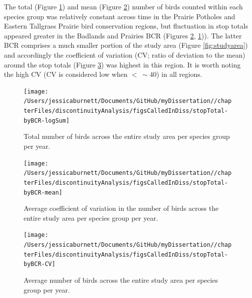 \documentclass[12pt,twoside,openany]{reedthesis}
\begin{document}
The total (Figure \ref{fig:stopTotalSum}) and mean (Figure \ref{fig:stopTotalMean}) number of birds counted within each species group was relatively constant across time in the Prairie Potholes and Eastern Tallgrass Prairie bird conservation regions, but fluctuation in stop totals appeared greater in the Badlands and Prairies BCR (Figures \ref{fig:stopTotalMean}, \ref{fig:stopTotalSum})). The latter BCR comprises a much smaller portion of the study area (Figure \ref{fig:studyarea}) and accordingly the coefficient of variation (CV; ratio of deviation to the mean) around the stop totals (Figure \ref{fig:stopTotalCV}) was highest in this region. It is worth noting the high CV (CV is considered low when \(<\ \sim40%
\)) in all regions.
\begin{figure}[bth]

{\centering \texttt{[image: /Users/jessicaburnett/Documents/GitHub/myDissertation//chapterFiles/discontinuityAnalysis/figsCalledInDiss/stopTotal-byBCR-logSum]} 

}

\caption{Total number of birds across the entire study area per species group per year. }\label{fig:stopTotalSum}
\end{figure}
\begin{figure}[bth]

{\centering \texttt{[image: /Users/jessicaburnett/Documents/GitHub/myDissertation//chapterFiles/discontinuityAnalysis/figsCalledInDiss/stopTotal-byBCR-mean]} 

}

\caption{Average coefficient of variation in the number of birds across the entire study area per species group per year.}\label{fig:stopTotalMean}
\end{figure}
\begin{figure}[bth]

{\centering \texttt{[image: /Users/jessicaburnett/Documents/GitHub/myDissertation//chapterFiles/discontinuityAnalysis/figsCalledInDiss/stopTotal-byBCR-CV]} 

}

\caption{Average number of birds across the entire study area per species group per year. }\label{fig:stopTotalCV}
\end{figure}
\end{document}
